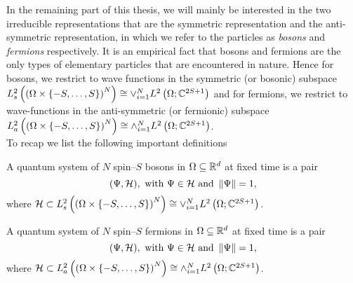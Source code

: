 		In the remaining part of this thesis, we will mainly be interested in the two irreducible representations that are the symmetric representation and the anti-symmetric representation, in which we refer to the particles as \emph{bosons} and \emph{fermions} respectively. It is an empirical fact that bosons and fermions are the only types of elementary particles that are encountered in nature. Hence for bosons, we restrict to wave functions in the symmetric (or bosonic) subspace $ L^2_{s}\left(\left(\Omega\times \{-S,\ldots,S\}\right)^N \right)\cong\vee_{i=1}^{N}L^2\left(\Omega; \mathbb{C}^{2S+1}\right)$ and for fermions, we restrict to wave-functions in the anti-symmetric (or fermionic) subspace $ L^2_{a}\left(\left(\Omega\times \{-S,\ldots,S\}\right)^N \right)\cong\wedge_{i=1}^{N}L^2\left(\Omega; \mathbb{C}^{2S+1}\right)$.\\
		To recap we list the following important definitions
		\begin{definition}
			A quantum system of $N$ spin--$ S $ bosons in $ \Omega\subseteq\mathbb{R}^d $ at fixed time is a pair
			\begin{equation*}
			(\Psi,\mathcal{H}),\text{ with } \Psi\in\mathcal{H}\text{ and }\left\lVert \Psi \right\rVert=1,
			\end{equation*}
			where $ \mathcal{H}\subset L^2_{s}\left(\left(\Omega\times \{-S,\ldots,S\}\right)^N \right)\cong\vee_{i=1}^{N}L^2\left(\Omega; \mathbb{C}^{2S+1}\right) $.
		\end{definition}
		\begin{definition}
			A quantum system of $N$ spin--$ S $ fermions in $ \Omega\subseteq\mathbb{R}^d $ at fixed time is a pair
			\begin{equation*}
			(\Psi,\mathcal{H}),\text{ with } \Psi\in\mathcal{H}\text{ and }\left\lVert \Psi \right\rVert=1,
			\end{equation*}
			where $ \mathcal{H}\subset L^2_{a}\left(\left(\Omega\times \{-S,\ldots,S\}\right)^N \right)\cong\wedge_{i=1}^{N}L^2\left(\Omega; \mathbb{C}^{2S+1}\right) $.
		\end{definition}
	
